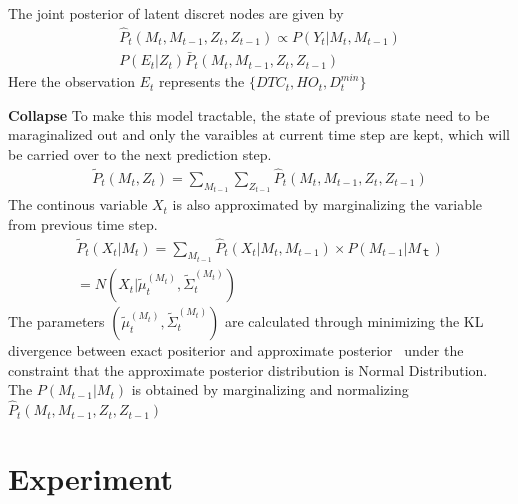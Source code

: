 \documentclass[10pt,twocolumn,letterpaper]{article}
\begin{document}
    The joint posterior of latent discret nodes are given by 
    \begin{eqnarray*}
        \hat{P}_t(M_t, M_{t-1}, Z_t, Z_{t-1})\propto P(Y_t|M_t, M_{t-1})\\
        P(E_t|Z_t)\bar{P}_t(M_t,M_{t-1},Z_t,Z_{t-1})
    \end{eqnarray*}
    Here the observation $E_t$ represents the $\{DTC_t, HO_t, D_t^{min}\}$

    \noindent
    \textbf{Collapse}
    To make this model tractable, the state of previous state need to be maraginalized out and only
    the varaibles at current time step are kept, which will be carried over to the next prediction step.
    \begin{eqnarray*}
        \tilde{P}_t(M_t,Z_t) = \sum_{M_{t-1}}\sum_{Z_{t-1}}\hat{P}_t(M_t, M_{t-1}, Z_t, Z_{t-1})
    \end{eqnarray*}
    The continous variable $X_t$ is also approximated by marginalizing the variable from previous time
    step. 
    \begin{eqnarray*}
        \tilde{P}_t(X_t|M_t) = \sum_{M_{t-1}} \hat{P}_t(X_t|M_t, M_{t-1})\times P(M_{t-1}|M_ｔ) \\
        = N(X_t|\tilde{\mu}_t^{(M_t)}, \tilde{\Sigma}_t^{(M_t)})
    \end{eqnarray*}
    The parameters $(\tilde{\mu}_t^{(M_t)}, \tilde{\Sigma}_t^{(M_t)})$ are calculated through minimizing
    the KL divergence between exact positerior and approximate posterior~\cite{IEEEhowto:minka} under
    the constraint that the approximate posterior distribution is Normal Distribution.
    The $P(M_{t-1}|M_t)$ is obtained by marginalizing and normalizing $\hat{P}_t(M_t, M_{t-1}, Z_t, Z_{t-1})$

    \section{Experiment}
\end{document}
